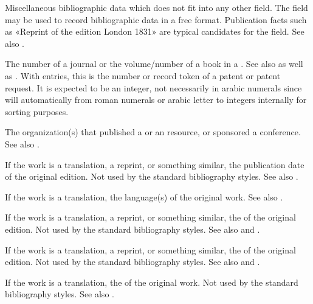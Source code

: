 \documentclass{ltxdockit}[2011/03/25]
\newcommand*{\biber}{\sty{biber}\xspace}
\begin{document}
\begin{fieldlist}

Miscellaneous bibliographic data which does not fit into any other field. The  field may be used to record bibliographic data in a free format. Publication facts such as «Reprint of the edition London 1831» are typical candidates for the  field. See also .


The number of a journal or the volume\slash number of a book in a . See also  as well as . With  entries, this is the number or record token of a patent or patent request. It is expected to be an integer, not necessarily in arabic numerals since \biber will automatically from roman numerals or arabic letter to integers internally for sorting purposes.


The organization(s) that published a  or an  resource, or sponsored a conference. See also .


If the work is a translation, a reprint, or something similar, the publication date of the original edition. Not used by the standard bibliography styles. See also .


If the work is a translation, the language(s) of the original work. See also .


If the work is a translation, a reprint, or something similar, the  of the original edition. Not used by the standard bibliography styles. See also  and .


If the work is a translation, a reprint, or something similar, the  of the original edition. Not used by the standard bibliography styles. See also  and .


If the work is a translation, the  of the original work. Not used by the standard bibliography styles. See also .


\end{fieldlist}
\end{document}

